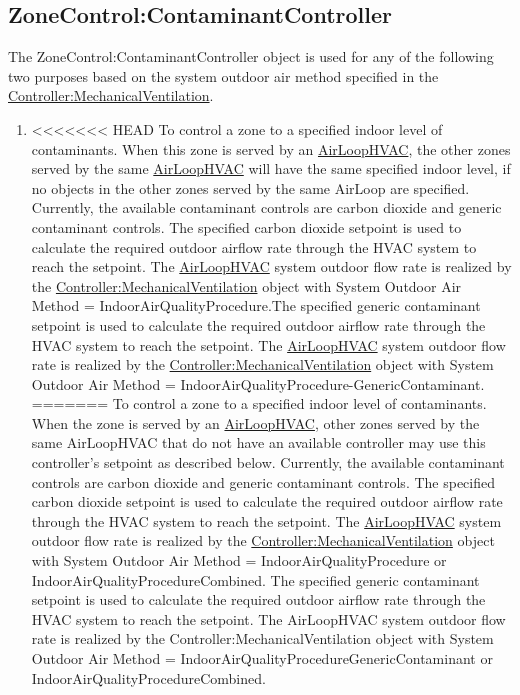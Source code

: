 \subsection{ZoneControl:ContaminantController}\label{zonecontrolcontaminantcontroller}

The ZoneControl:ContaminantController object is used for any of the following two purposes based on the system outdoor air method specified in the \hyperref[controllermechanicalventilation]{Controller:MechanicalVentilation}.

\begin{enumerate}
\def\labelenumi{\arabic{enumi})}
\item
<<<<<<< HEAD
  To control a zone to a specified indoor level of contaminants. When this zone is served by an \hyperref[airloophvac]{AirLoopHVAC}, the other zones served by the same \hyperref[airloophvac]{AirLoopHVAC} will have the same specified indoor level, if no objects in the other zones served by the same AirLoop are specified. Currently, the available contaminant controls are carbon dioxide and generic contaminant controls. The specified carbon dioxide setpoint is used to calculate the required outdoor airflow rate through the HVAC system to reach the setpoint. The \hyperref[airloophvac]{AirLoopHVAC} system outdoor flow rate is realized by the \hyperref[controllermechanicalventilation]{Controller:MechanicalVentilation} object with System Outdoor Air Method = IndoorAirQualityProcedure.The specified generic contaminant setpoint is used to calculate the required outdoor airflow rate through the HVAC system to reach the setpoint. The \hyperref[airloophvac]{AirLoopHVAC} system outdoor flow rate is realized by the \hyperref[controllermechanicalventilation]{Controller:MechanicalVentilation} object with System Outdoor Air Method = IndoorAirQualityProcedure-GenericContaminant.
=======
  To control a zone to a specified indoor level of contaminants. When the zone is served by an \hyperref[airloophvac]{AirLoopHVAC}, other zones served by the same AirLoopHVAC that do not have an available controller may use this controller's setpoint as described below. Currently, the available contaminant controls are carbon dioxide and generic contaminant controls. The specified carbon dioxide setpoint is used to calculate the required outdoor airflow rate through the HVAC system to reach the setpoint. The \hyperref[airloophvac]{AirLoopHVAC} system outdoor flow rate is realized by the \hyperref[controllermechanicalventilation]{Controller:MechanicalVentilation} object with System Outdoor Air Method = IndoorAirQualityProcedure or IndoorAirQualityProcedureCombined. The specified generic contaminant setpoint is used to calculate the required outdoor airflow rate through the HVAC system to reach the setpoint. The AirLoopHVAC system outdoor flow rate is realized by the Controller:MechanicalVentilation object with System Outdoor Air Method = IndoorAirQualityProcedureGenericContaminant or IndoorAirQualityProcedureCombined.

\end{enumerate}

